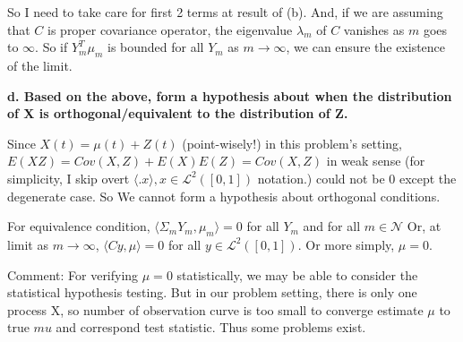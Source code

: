 \documentclass{article}
\begin{document}
So I need to take care for first 2 terms at result of (b). 
And, if we are assuming that $C$ is proper covariance operator,
the eigenvalue $\lambda_m$ of $C$ vanishes as $m$ goes to $\infty$. So if $Y_m^T\mu_m$ is bounded for all $Y_m$ 
as $m\rightarrow\infty$,
we can ensure the existence of the limit.

\textbf{
d. Based on the above, form a hypothesis about when the distribution of X is orthogonal/equivalent 
to the distribution of Z.
}

Since $X(t)=\mu(t)+Z(t)$ (point-wisely!) in this problem's setting, 
$E(XZ)=Cov(X,Z)+E(X)E(Z)=Cov(X,Z)$ in weak sense (for simplicity, I skip overt $\langle .x \rangle, x\in \mathcal{L}^2([0,1])$ notation.)
could not be 0 except the degenerate case. So We cannot form a hypothesis about orthogonal conditions.

For equivalence condition, $\langle \Sigma_mY_m, \mu_m\rangle=0$ for all $Y_m$ and for all $m\in\mathcal{N}$
Or, at limit as $m\rightarrow\infty$, $\langle Cy, \mu\rangle=0$ for all $y\in\mathcal{L}^2([0,1])$.
Or more simply, $\mu=0$.

Comment: For verifying $\mu=0$ statistically, we may be able to consider the statistical hypothesis testing.
But in our problem setting, there is only one process X, so number of observation curve is too small
to converge estimate $\mu$ to true $mu$ and correspond test statistic. Thus some problems exist.
\end{document}
